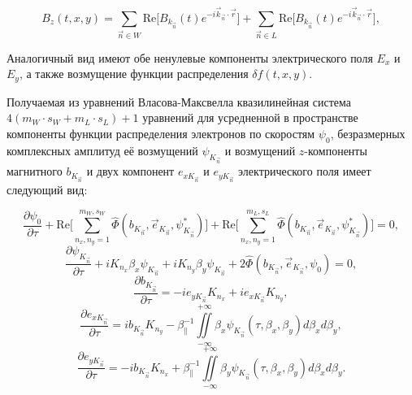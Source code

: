 \begin{equation}
B_z(t,x,y)
=
\sum_{\vec n\in W}\mathrm{Re}\bigl[B_{k_{\vec n}}(t)e^{-i\vec k_{\vec n}\cdot\vec r}\bigr]
+
\sum_{\vec n\in L}\mathrm{Re}\bigl[B_{k_{\vec n}}(t)e^{-i\vec k_{\vec n}\cdot\vec r}\bigr],
\end{equation}

Аналогичный вид имеют обе ненулевые компоненты электрического поля $E_x$ и $E_y$, а также возмущение функции распределения $\delta f(t,x,y)$. 

Получаемая из уравнений Власова-Максвелла квазилинейная система $4(m_W\cdot s_W+m_L\cdot s_L)+1$ уравнений для усредненной в пространстве компоненты функции распределения электронов по скоростям $\psi_0$, безразмерных комплексных амплитуд её возмущений $\psi_{K_{\vec{n}}}$ и возмущений $z$-компоненты магнитного $b_{K_{\vec{n}}}$ и двух компонент $e_{x{K_{\vec{n}}}}$ и $e_{y{K_{\vec{n}}}}$ электрического поля имеет следующий вид:

\begin{equation}
\label{eq14}
    \dfrac{\partial \psi_0}{\partial \tau} 
    + \mathrm{Re}\Biggl[\sum\limits^{m_W,s_W}_{n_x,n_y=1} \hat \Phi(b_{K_{\vec{n}}},\overrightarrow{e}_{K_{\vec{n}}},\psi_{K_{\vec{n}}}^*) 
     \Biggr]+ \mathrm{Re}\Biggl[\sum\limits^{m_L,s_L}_{n_x,n_y=1} \hat \Phi(b_{K_{\vec{n}}},\overrightarrow{e}_{K_{\vec{n}}},\psi_{K_{\vec{n}}}^*) 
     \Biggr]=0,
\end{equation}
\begin{equation}
    \label{eq15}
    \dfrac{\partial \psi_{K_{\vec{n}}}}{\partial \tau}+iK_{n_x}\beta_x\psi_{K_{\vec{n}}}+iK_{n_y}\beta_y\psi_{K_{\vec{n}}}+2\hat \Phi(b_{K_{\vec{n}}},\overrightarrow{e}_{K_{\vec{n}}},\psi_0)=0,
\end{equation}
\begin{equation}
    \dfrac{\partial b_{K_{\vec{n}}}}{\partial \tau}=-ie_{y{K_{\vec{n}}}}K_{n_x}+ie_{x{K_{\vec{n}}}}K_{n_y},
\end{equation}
\begin{equation}
    \dfrac{\partial e_{x{K_{\vec{n}}}}}{\partial \tau}=ib_{K_{\vec{n}}}K_{n_y}-\beta_{\|}^{-1}\iint\limits^{+\infty}_{-\infty}\beta_x\psi_{K_{\vec{n}}}(\tau,\beta_x,\beta_y)d\beta_xd\beta_y,
\end{equation}
\begin{equation}
\label{eq19}
    \dfrac{\partial e_{y{K_{\vec{n}}}}}{\partial \tau}=-ib_{K_{\vec{n}}}K_{n_x}+\beta_{\|}^{-1}{\iint\limits^{+\infty}_{-\infty}\beta_y\psi_{K_{\vec{n}}}(\tau,\beta_x,\beta_y)d\beta_xd\beta_y} .
\end{equation}

